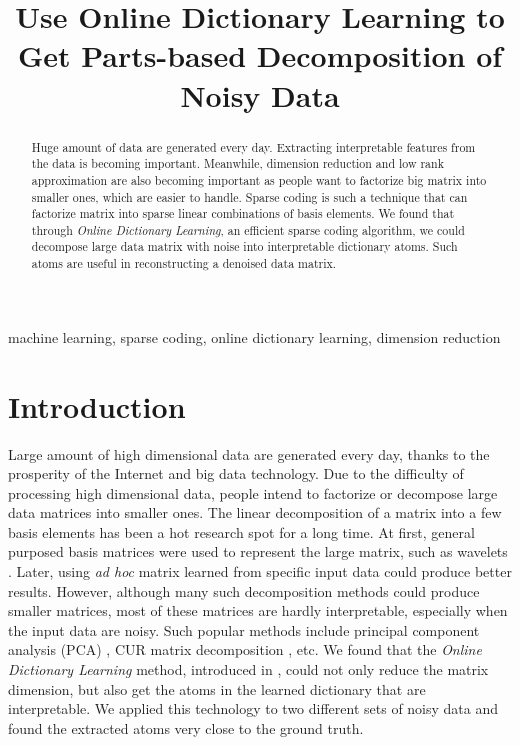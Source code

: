 \documentclass[conference]{IEEEtran}
\begin{document}
\title{Use Online Dictionary Learning to Get Parts-based Decomposition of Noisy Data}

\author{
}

\maketitle

\begin{abstract}
Huge amount of data are generated every day. Extracting interpretable features from the data is becoming important. Meanwhile, dimension reduction and low rank approximation are also becoming important as people want to factorize big matrix into smaller ones, which are easier to handle. Sparse coding is such a technique that can factorize matrix into sparse linear combinations of basis elements. We found that through \textit{Online Dictionary Learning}, an efficient sparse coding algorithm, we could decompose large data matrix with noise into interpretable dictionary atoms. Such atoms are useful in reconstructing a denoised data matrix.
\end{abstract}

\begin{IEEEkeywords}
machine learning, sparse coding, online dictionary learning, dimension reduction
\end{IEEEkeywords}

\section{Introduction}
Large amount of high dimensional data are generated every day, thanks to the prosperity of the Internet and big data technology. Due to the difficulty of processing high dimensional data, people intend to factorize or decompose large data matrices into smaller ones. The linear decomposition of a matrix into a few basis elements has been a hot research spot for a long time. At first, general purposed basis matrices were used to represent the large matrix, such as wavelets \cite{b1}. Later, using \textit{ad hoc} matrix learned from specific input data could produce better results. However, although many such decomposition methods could produce smaller matrices, most of these matrices are hardly interpretable, especially when the input data are noisy. Such popular methods include principal component analysis (PCA) \cite{b2}, CUR matrix decomposition \cite{b3}, etc. We found that the \textit{Online Dictionary Learning} method, introduced in \cite{b4}, could not only reduce the matrix dimension, but also get the atoms in the learned dictionary that are interpretable. We applied this technology to two different sets of noisy data and found the extracted atoms very close to the ground truth.
\end{document}
